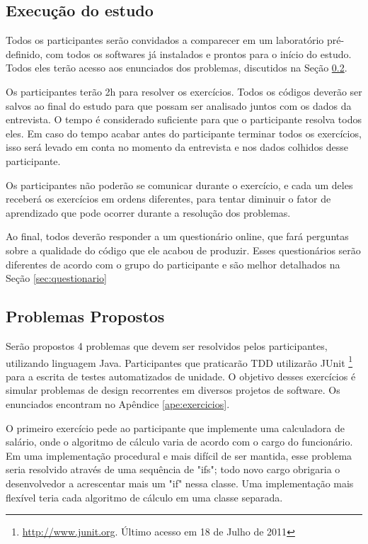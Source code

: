 \subsection{Execução do estudo}
\label{sec:execucao}	

Todos os participantes serão convidados a comparecer em um laboratório pré-definido,
com todos os softwares já instalados e prontos para o início do estudo. Todos eles
terão acesso aos enunciados dos problemas, discutidos na
Seção \ref{sec:exercicios}.

Os participantes terão 2h para resolver os exercícios. 
Todos os códigos deverão ser salvos ao final do estudo para que possam ser analisado juntos
com os dados da entrevista.
O tempo é considerado suficiente
para que o participante resolva todos eles. Em caso do tempo acabar antes do participante
terminar todos os exercícios, isso será levado em conta no momento da entrevista e nos
dados colhidos desse participante.

Os participantes não poderão se comunicar durante o exercício, e cada um deles receberá
os exercícios em ordens diferentes, para tentar diminuir o fator de aprendizado que 
pode ocorrer durante a resolução dos problemas.

Ao final, todos deverão responder a um questionário online, que fará perguntas sobre a qualidade
do código que ele acabou de produzir. Esses questionários serão diferentes de acordo com o 
grupo do participante e são melhor detalhados na Seção \ref{sec:questionario}

\subsection{Problemas Propostos}
\label{sec:exercicios}

Serão propostos 4 problemas que devem ser resolvidos pelos participantes, utilizando
linguagem Java. Participantes que praticarão TDD utilizarão JUnit \footnote{\url{http://www.junit.org}. Último acesso em 18 de Julho de 2011} 
para a escrita de testes
automatizados de unidade. O objetivo desses exercícios é simular problemas de design 
recorrentes em diversos projetos de software.  Os enunciados encontram no Apêndice 
\ref{ape:exercicios}.

O primeiro exercício pede ao participante que implemente uma calculadora de salário, onde
o algoritmo de cálculo varia de acordo com o cargo do funcionário. Em uma implementação
procedural e mais difícil de ser mantida, esse problema seria resolvido através de uma
sequência de "ifs"; todo novo cargo obrigaria o desenvolvedor a acrescentar mais um "if" 
nessa classe. Uma implementação mais flexível teria cada algoritmo de cálculo em uma 
classe separada.

